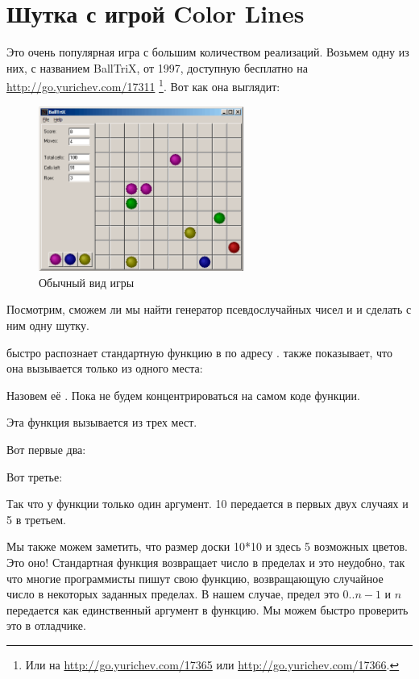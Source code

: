 ﻿\clearpage
\section{Шутка с игрой Color Lines}
\label{chap:color_lines}

Это очень популярная игра с большим количеством реализаций.
Возьмем одну из них, с названием BallTriX, от 1997, доступную бесплатно на \url{http://go.yurichev.com/17311}
\footnote{Или на \url{http://go.yurichev.com/17365} или \url{http://go.yurichev.com/17366}.}.
Вот как она выглядит:

\begin{figure}[H]
\centering
\includegraphics[width=0.6\textwidth]{examples/lines/1.png}
\caption{Обычный вид игры}
\label{fig:lines_1}
\end{figure}

\clearpage
{}
Посмотрим, сможем ли мы найти генератор псевдослучайных чисел и и сделать с ним одну шутку.

\IDA быстро распознает стандартную функцию  в 
 по адресу .
\IDA также показывает, что она вызывается только из одного места:



Назовем её .
Пока не будем концентрироваться на самом коде функции.

Эта функция вызывается из трех мест.

Вот первые два:



Вот третье:



Так что у функции только один аргумент.
10 передается в первых двух случаях и 5 в третьем.

Мы также можем заметить, что размер доски 10*10 и здесь 5 возможных цветов.
Это оно!
Стандартная функция  возвращает число в пределах  и это неудобно, так что многие программисты пишут свою функцию,
возвращающую случайное число в некоторых заданных пределах.
В нашем случае, предел это $0..n-1$ и $n$ передается как
единственный аргумент в функцию.
Мы можем быстро проверить это в отладчике.


